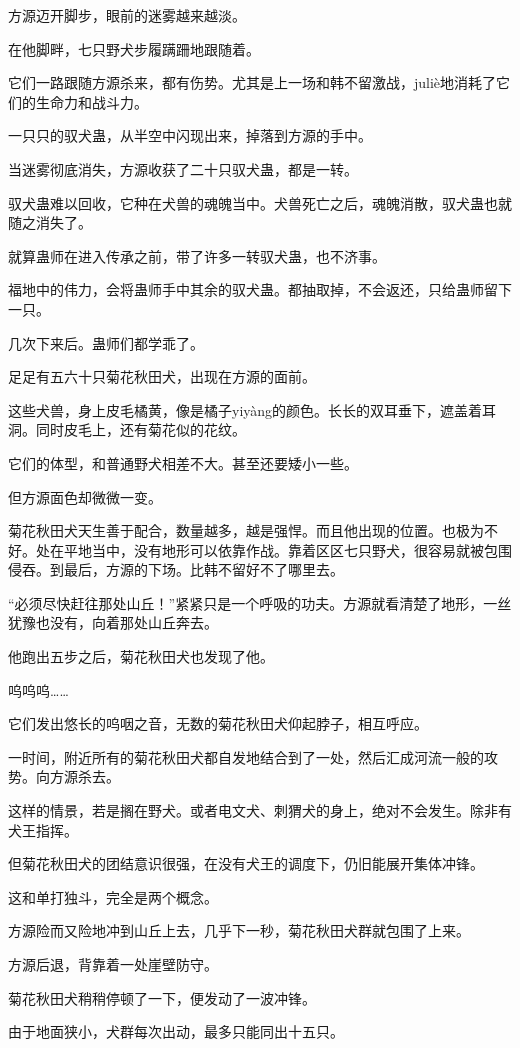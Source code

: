\begin{this_body}
方源迈开脚步，眼前的迷雾越来越淡。

在他脚畔，七只野犬步履蹒跚地跟随着。

它们一路跟随方源杀来，都有伤势。尤其是上一场和韩不留激战，juliè地消耗了它们的生命力和战斗力。

一只只的驭犬蛊，从半空中闪现出来，掉落到方源的手中。

当迷雾彻底消失，方源收获了二十只驭犬蛊，都是一转。

驭犬蛊难以回收，它种在犬兽的魂魄当中。犬兽死亡之后，魂魄消散，驭犬蛊也就随之消失了。

就算蛊师在进入传承之前，带了许多一转驭犬蛊，也不济事。

福地中的伟力，会将蛊师手中其余的驭犬蛊。都抽取掉，不会返还，只给蛊师留下一只。

几次下来后。蛊师们都学乖了。

足足有五六十只菊花秋田犬，出现在方源的面前。

这些犬兽，身上皮毛橘黄，像是橘子yiyàng的颜色。长长的双耳垂下，遮盖着耳洞。同时皮毛上，还有菊花似的花纹。

它们的体型，和普通野犬相差不大。甚至还要矮小一些。

但方源面色却微微一变。

菊花秋田犬天生善于配合，数量越多，越是强悍。而且他出现的位置。也极为不好。处在平地当中，没有地形可以依靠作战。靠着区区七只野犬，很容易就被包围侵吞。到最后，方源的下场。比韩不留好不了哪里去。

“必须尽快赶往那处山丘！”紧紧只是一个呼吸的功夫。方源就看清楚了地形，一丝犹豫也没有，向着那处山丘奔去。

他跑出五步之后，菊花秋田犬也发现了他。

呜呜呜……

它们发出悠长的呜咽之音，无数的菊花秋田犬仰起脖子，相互呼应。

一时间，附近所有的菊花秋田犬都自发地结合到了一处，然后汇成河流一般的攻势。向方源杀去。

这样的情景，若是搁在野犬。或者电文犬、刺猬犬的身上，绝对不会发生。除非有犬王指挥。

但菊花秋田犬的团结意识很强，在没有犬王的调度下，仍旧能展开集体冲锋。

这和单打独斗，完全是两个概念。

方源险而又险地冲到山丘上去，几乎下一秒，菊花秋田犬群就包围了上来。

方源后退，背靠着一处崖壁防守。

菊花秋田犬稍稍停顿了一下，便发动了一波冲锋。

由于地面狭小，犬群每次出动，最多只能同出十五只。


\end{this_body}
